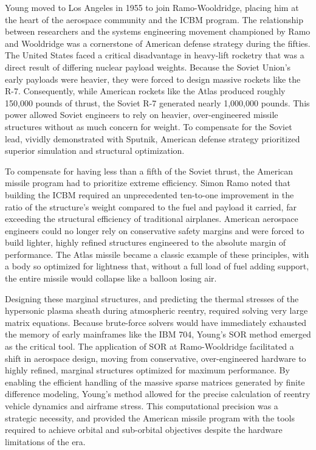 Young moved to Los Angeles in 1955 to join Ramo-Wooldridge, placing him at the heart of the aerospace community and the ICBM program. The relationship between researchers and the systems engineering movement championed by Ramo and Wooldridge was a cornerstone of American defense strategy during the fifties. The United States faced a critical disadvantage in heavy-lift rocketry that was a direct result of differing nuclear payload weights. Because the Soviet Union's early payloads were heavier, they were forced to design massive rockets like the R-7. Consequently, while American rockets like the Atlas produced roughly 150,000 pounds of thrust, the Soviet R-7 generated nearly 1,000,000 pounds. This power allowed Soviet engineers to rely on heavier, over-engineered missile structures without as much concern for weight. To compensate for the Soviet lead, vividly demonstrated with Sputnik, American defense strategy prioritized superior simulation and structural optimization. 

To compensate for having less than a fifth of the Soviet thrust, the American missile program had to prioritize extreme efficiency. Simon Ramo noted that building the ICBM required an unprecedented ten-to-one improvement in the ratio of the structure's weight compared to the fuel and payload it carried, far exceeding the structural efficiency of traditional airplanes. American aerospace engineers could no longer rely on conservative safety margins and were forced to build lighter, highly refined structures engineered to the absolute margin of performance. The Atlas missile became a classic example of these principles, with a body so optimized for lightness that, without a full load of fuel adding support, the entire missile would collapse like a balloon losing air. 

Designing these marginal structures, and predicting the thermal stresses of the hypersonic plasma sheath during atmospheric reentry, required solving very large matrix equations. Because brute-force solvers would have immediately exhausted the memory of early mainframes like the IBM 704, Young's SOR method emerged as the critical tool. The application of SOR at Ramo-Wooldridge facilitated a shift in aerospace design, moving from conservative, over-engineered hardware to highly refined, marginal structures optimized for maximum performance. By enabling the efficient handling of the massive sparse matrices generated by finite difference modeling, Young’s method allowed for the precise calculation of reentry vehicle dynamics and airframe stress. This computational precision was a strategic necessity, and provided the American missile program with the tools required to achieve orbital and sub-orbital objectives despite the hardware limitations of the era. 

